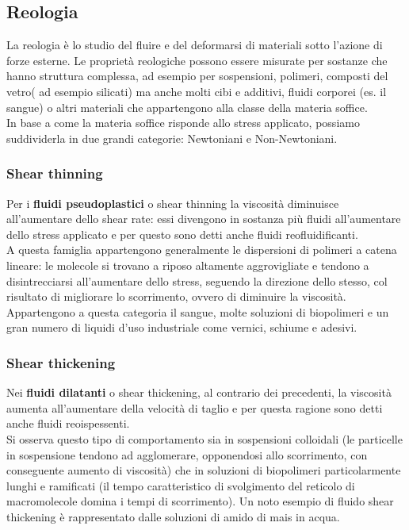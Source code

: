 \documentclass[letterpaper,12pt]{article}
\begin{document}
\subsection{Reologia}
La reologia è lo studio del fluire e del deformarsi di materiali sotto l'azione di forze esterne. Le proprietà reologiche possono essere misurate per sostanze che hanno struttura complessa, ad esempio per sospensioni, polimeri, composti del vetro( ad esempio silicati) ma anche molti cibi e additivi, fluidi corporei (es. il sangue) o altri materiali che appartengono alla classe della materia soffice.\\
In base a come la materia soffice risponde allo stress applicato, possiamo suddividerla in due grandi categorie: Newtoniani e Non-Newtoniani.

\subsubsection{Shear thinning}
Per i \textbf{fluidi pseudoplastici} o shear thinning la viscosità diminuisce all'aumentare dello shear rate: essi divengono in sostanza più fluidi all'aumentare dello stress applicato e per questo sono detti anche fluidi reofluidificanti.\\
A questa famiglia appartengono generalmente le dispersioni di polimeri a catena lineare: le molecole si trovano a riposo altamente aggrovigliate e tendono a disintrecciarsi all'aumentare dello stress, seguendo la direzione dello stesso, col risultato di migliorare lo scorrimento, ovvero di diminuire la viscosità.\\
Appartengono a questa categoria il sangue, molte soluzioni di biopolimeri e
un gran numero di liquidi d'uso industriale come vernici, schiume e adesivi.

\subsubsection{Shear thickening}
Nei \textbf{fluidi dilatanti} o shear thickening, al contrario dei precedenti, la viscosità aumenta all'aumentare della velocità di taglio e per questa ragione sono detti anche fluidi reoispessenti.\\
Si osserva questo tipo di comportamento sia in sospensioni colloidali (le particelle in sospensione tendono ad agglomerare, opponendosi allo scorrimento, con conseguente aumento di viscosità) che in soluzioni di biopolimeri particolarmente lunghi e ramificati (il tempo caratteristico di svolgimento del reticolo di macromolecole domina i tempi di scorrimento). Un noto esempio di fluido shear thickening è rappresentato dalle soluzioni di amido di mais in acqua.
\end{document}
